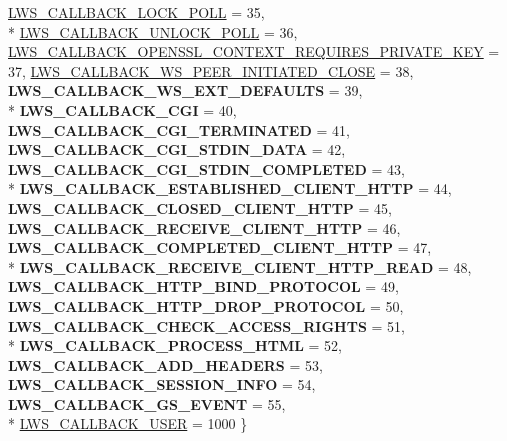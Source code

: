 \begin{DoxyCompactItemize}
\hyperlink{group__usercb_ggad62860e19975ba4c4af401c3cdb6abf7a8909732521d379179003d97ab7a05428}{L\+W\+S\+\_\+\+C\+A\+L\+L\+B\+A\+C\+K\+\_\+\+L\+O\+C\+K\+\_\+\+P\+O\+LL} = 35, 
\\*
\hyperlink{group__usercb_ggad62860e19975ba4c4af401c3cdb6abf7a0e9e3dd667c0c42cdbe1a3d921f4fd79}{L\+W\+S\+\_\+\+C\+A\+L\+L\+B\+A\+C\+K\+\_\+\+U\+N\+L\+O\+C\+K\+\_\+\+P\+O\+LL} = 36, 
\hyperlink{group__usercb_ggad62860e19975ba4c4af401c3cdb6abf7aa46f705dcf97502e95627ffde614f98b}{L\+W\+S\+\_\+\+C\+A\+L\+L\+B\+A\+C\+K\+\_\+\+O\+P\+E\+N\+S\+S\+L\+\_\+\+C\+O\+N\+T\+E\+X\+T\+\_\+\+R\+E\+Q\+U\+I\+R\+E\+S\+\_\+\+P\+R\+I\+V\+A\+T\+E\+\_\+\+K\+EY} = 37, 
\hyperlink{group__usercb_ggad62860e19975ba4c4af401c3cdb6abf7ac3fc5bbb55e69f90396526287ee84a51}{L\+W\+S\+\_\+\+C\+A\+L\+L\+B\+A\+C\+K\+\_\+\+W\+S\+\_\+\+P\+E\+E\+R\+\_\+\+I\+N\+I\+T\+I\+A\+T\+E\+D\+\_\+\+C\+L\+O\+SE} = 38, 
{\bfseries L\+W\+S\+\_\+\+C\+A\+L\+L\+B\+A\+C\+K\+\_\+\+W\+S\+\_\+\+E\+X\+T\+\_\+\+D\+E\+F\+A\+U\+L\+TS} = 39, 
\\*
{\bfseries L\+W\+S\+\_\+\+C\+A\+L\+L\+B\+A\+C\+K\+\_\+\+C\+GI} = 40, 
{\bfseries L\+W\+S\+\_\+\+C\+A\+L\+L\+B\+A\+C\+K\+\_\+\+C\+G\+I\+\_\+\+T\+E\+R\+M\+I\+N\+A\+T\+ED} = 41, 
{\bfseries L\+W\+S\+\_\+\+C\+A\+L\+L\+B\+A\+C\+K\+\_\+\+C\+G\+I\+\_\+\+S\+T\+D\+I\+N\+\_\+\+D\+A\+TA} = 42, 
{\bfseries L\+W\+S\+\_\+\+C\+A\+L\+L\+B\+A\+C\+K\+\_\+\+C\+G\+I\+\_\+\+S\+T\+D\+I\+N\+\_\+\+C\+O\+M\+P\+L\+E\+T\+ED} = 43, 
\\*
{\bfseries L\+W\+S\+\_\+\+C\+A\+L\+L\+B\+A\+C\+K\+\_\+\+E\+S\+T\+A\+B\+L\+I\+S\+H\+E\+D\+\_\+\+C\+L\+I\+E\+N\+T\+\_\+\+H\+T\+TP} = 44, 
{\bfseries L\+W\+S\+\_\+\+C\+A\+L\+L\+B\+A\+C\+K\+\_\+\+C\+L\+O\+S\+E\+D\+\_\+\+C\+L\+I\+E\+N\+T\+\_\+\+H\+T\+TP} = 45, 
{\bfseries L\+W\+S\+\_\+\+C\+A\+L\+L\+B\+A\+C\+K\+\_\+\+R\+E\+C\+E\+I\+V\+E\+\_\+\+C\+L\+I\+E\+N\+T\+\_\+\+H\+T\+TP} = 46, 
{\bfseries L\+W\+S\+\_\+\+C\+A\+L\+L\+B\+A\+C\+K\+\_\+\+C\+O\+M\+P\+L\+E\+T\+E\+D\+\_\+\+C\+L\+I\+E\+N\+T\+\_\+\+H\+T\+TP} = 47, 
\\*
{\bfseries L\+W\+S\+\_\+\+C\+A\+L\+L\+B\+A\+C\+K\+\_\+\+R\+E\+C\+E\+I\+V\+E\+\_\+\+C\+L\+I\+E\+N\+T\+\_\+\+H\+T\+T\+P\+\_\+\+R\+E\+AD} = 48, 
{\bfseries L\+W\+S\+\_\+\+C\+A\+L\+L\+B\+A\+C\+K\+\_\+\+H\+T\+T\+P\+\_\+\+B\+I\+N\+D\+\_\+\+P\+R\+O\+T\+O\+C\+OL} = 49, 
{\bfseries L\+W\+S\+\_\+\+C\+A\+L\+L\+B\+A\+C\+K\+\_\+\+H\+T\+T\+P\+\_\+\+D\+R\+O\+P\+\_\+\+P\+R\+O\+T\+O\+C\+OL} = 50, 
{\bfseries L\+W\+S\+\_\+\+C\+A\+L\+L\+B\+A\+C\+K\+\_\+\+C\+H\+E\+C\+K\+\_\+\+A\+C\+C\+E\+S\+S\+\_\+\+R\+I\+G\+H\+TS} = 51, 
\\*
{\bfseries L\+W\+S\+\_\+\+C\+A\+L\+L\+B\+A\+C\+K\+\_\+\+P\+R\+O\+C\+E\+S\+S\+\_\+\+H\+T\+ML} = 52, 
{\bfseries L\+W\+S\+\_\+\+C\+A\+L\+L\+B\+A\+C\+K\+\_\+\+A\+D\+D\+\_\+\+H\+E\+A\+D\+E\+RS} = 53, 
{\bfseries L\+W\+S\+\_\+\+C\+A\+L\+L\+B\+A\+C\+K\+\_\+\+S\+E\+S\+S\+I\+O\+N\+\_\+\+I\+N\+FO} = 54, 
{\bfseries L\+W\+S\+\_\+\+C\+A\+L\+L\+B\+A\+C\+K\+\_\+\+G\+S\+\_\+\+E\+V\+E\+NT} = 55, 
\\*
\hyperlink{group__usercb_ggad62860e19975ba4c4af401c3cdb6abf7a982579753e70e59a9ea13ce628ac891a}{L\+W\+S\+\_\+\+C\+A\+L\+L\+B\+A\+C\+K\+\_\+\+U\+S\+ER} = 1000
 \}
\end{DoxyCompactItemize}


